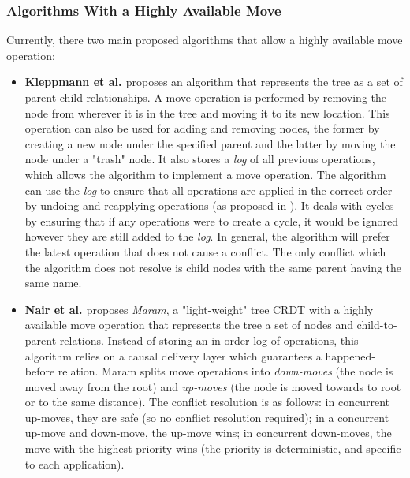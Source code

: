 \documentclass[12pt]{article}
\begin{document}
\subsubsection{Algorithms With a Highly Available Move} \label{sssec:algorithms}
Currently, there two main proposed algorithms that allow a highly available move operation:
\begin{itemize}
    \item
          \textbf{Kleppmann et al. \cite{9563274}} proposes an algorithm that represents the tree as a set of parent-child relationships. A move operation is performed by removing the node from wherever it is in the tree and moving it to its new location. This operation can also be used for adding and removing nodes, the former by creating a new node under the specified parent and the latter by moving the node under a "trash" node. It also stores a \textit{log} of all previous operations, which allows the algorithm to implement a move operation. The algorithm can use the \textit{log} to ensure that all operations are applied in the correct order by undoing and reapplying operations (as proposed in \cite{https://doi.org/10.48550/arxiv.1805.04263}). It deals with cycles by ensuring that if any operations were to create a cycle, it would be ignored however they are still added to the \textit{log}. In general, the algorithm will prefer the latest operation that does not cause a conflict. The only conflict which the algorithm does not resolve is child nodes with the same parent having the same name.

    \item
          \textbf{Nair et al. \cite{https://doi.org/10.48550/arxiv.2103.04828}} proposes \textit{Maram}, a "light-weight" tree CRDT with a highly available move operation that represents the tree a set of nodes and child-to-parent relations. Instead of storing an in-order log of operations, this algorithm relies on a causal delivery layer which guarantees
          a happened-before relation. Maram splits move operations into \textit{down-moves} (the node is moved away from the root) and \textit{up-moves} (the node is moved towards to root or to the same distance). The conflict resolution is as follows: in concurrent up-moves, they are safe (so no conflict resolution required); in a concurrent up-move and down-move, the up-move wins; in concurrent down-moves, the move with the highest priority wins (the priority is deterministic, and specific to each application).

\end{itemize}
\end{document}
